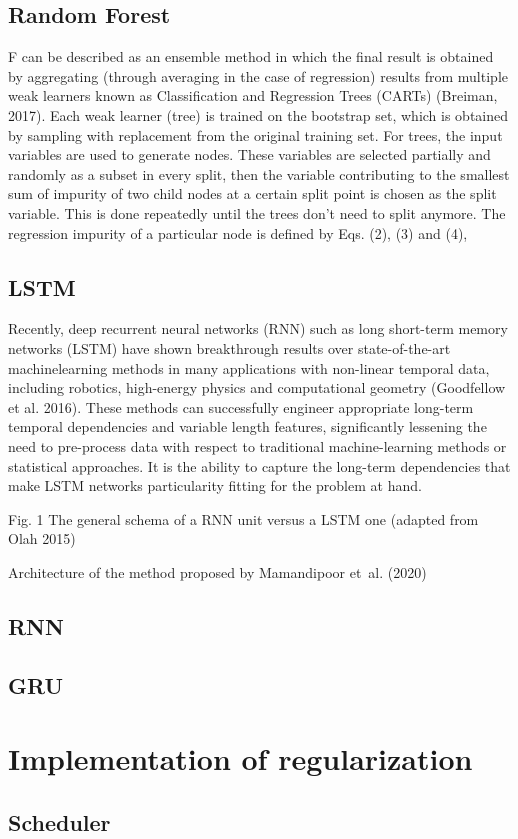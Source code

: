 \subsection{Random Forest}
F can be described as an ensemble method in which the final result is obtained by aggregating (through averaging in the case of regression) results from multiple weak learners known as Classification and Regression Trees (CARTs) (Breiman, 2017). Each weak learner (tree) is trained on the bootstrap set, which is obtained by sampling with replacement from the original training set. For trees, the input variables are used to generate nodes. These variables are selected partially and randomly as a subset in every split, then the variable contributing to the smallest sum of impurity of two child nodes at a certain split point is chosen as the split variable. This is done repeatedly until the trees don't need to split anymore. The regression impurity of a particular node is defined by Eqs. (2), (3) and (4), \citep{wangMachineLearningFramework2021}
\subsection{LSTM}
Recently, deep recurrent neural networks (RNN) such as long short-term memory networks (LSTM) have shown breakthrough results over state-of-the-art machinelearning methods in many applications with non-linear temporal data, including robotics, high-energy physics and computational geometry (Goodfellow et al. 2016). These methods can successfully engineer appropriate long-term temporal dependencies and variable length features, significantly lessening the need to pre-process data with respect to traditional machine-learning methods or statistical approaches. It is the ability to capture the long-term dependencies that make LSTM networks particularity fitting for the problem at hand. 

Fig. 1 The general schema of a RNN unit versus a LSTM one (adapted from Olah 2015)

Architecture of the method proposed by Mamandipoor et al. (2020)

\subsection{RNN}

\subsection{GRU}

\section{Implementation of regularization}

\subsection{Scheduler}

